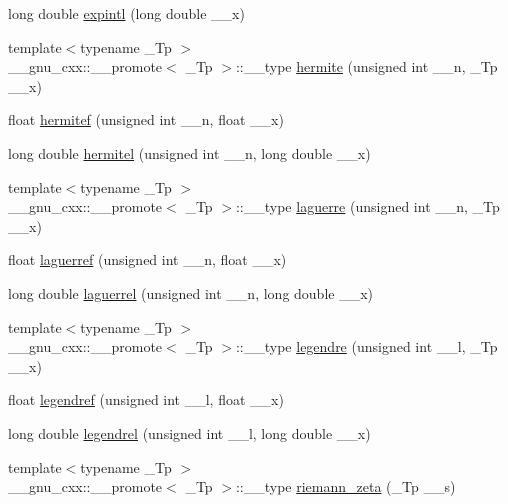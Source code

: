 \begin{DoxyCompactItemize}
\item 
long double \hyperlink{group__tr29124__math__spec__func_ga1329130b32328d0666e290ee5931fa4f}{expintl} (long double \+\_\+\+\_\+x)
\item 
{\footnotesize template$<$typename \+\_\+\+Tp $>$ }\\\+\_\+\+\_\+gnu\+\_\+cxx\+::\+\_\+\+\_\+promote$<$ \+\_\+\+Tp $>$\+::\+\_\+\+\_\+type \hyperlink{group__tr29124__math__spec__func_ga97632b8bf77c323b2369e8d327965bdf}{hermite} (unsigned int \+\_\+\+\_\+n, \+\_\+\+Tp \+\_\+\+\_\+x)
\item 
float \hyperlink{group__tr29124__math__spec__func_ga94dae7444bb349e33057a92932db8abe}{hermitef} (unsigned int \+\_\+\+\_\+n, float \+\_\+\+\_\+x)
\item 
long double \hyperlink{group__tr29124__math__spec__func_ga21f8e312ee3e65286f86bf141b0f32e0}{hermitel} (unsigned int \+\_\+\+\_\+n, long double \+\_\+\+\_\+x)
\item 
{\footnotesize template$<$typename \+\_\+\+Tp $>$ }\\\+\_\+\+\_\+gnu\+\_\+cxx\+::\+\_\+\+\_\+promote$<$ \+\_\+\+Tp $>$\+::\+\_\+\+\_\+type \hyperlink{group__tr29124__math__spec__func_gacae65579b397fddcd27954380d364a58}{laguerre} (unsigned int \+\_\+\+\_\+n, \+\_\+\+Tp \+\_\+\+\_\+x)
\item 
float \hyperlink{group__tr29124__math__spec__func_gada763419b0e21b38e38daa8b6eb56a8c}{laguerref} (unsigned int \+\_\+\+\_\+n, float \+\_\+\+\_\+x)
\item 
long double \hyperlink{group__tr29124__math__spec__func_gaaf8b141edf9163b37ea4f2ed3e0191fc}{laguerrel} (unsigned int \+\_\+\+\_\+n, long double \+\_\+\+\_\+x)
\item 
{\footnotesize template$<$typename \+\_\+\+Tp $>$ }\\\+\_\+\+\_\+gnu\+\_\+cxx\+::\+\_\+\+\_\+promote$<$ \+\_\+\+Tp $>$\+::\+\_\+\+\_\+type \hyperlink{group__tr29124__math__spec__func_gaf6eac7fcb98e25b8f3f7d1b95fa7add8}{legendre} (unsigned int \+\_\+\+\_\+l, \+\_\+\+Tp \+\_\+\+\_\+x)
\item 
float \hyperlink{group__tr29124__math__spec__func_gaed94e3c664c99f5204da75be75aeac21}{legendref} (unsigned int \+\_\+\+\_\+l, float \+\_\+\+\_\+x)
\item 
long double \hyperlink{group__tr29124__math__spec__func_ga1b39bc22e3cc4860d08eb54099460391}{legendrel} (unsigned int \+\_\+\+\_\+l, long double \+\_\+\+\_\+x)
\item 
{\footnotesize template$<$typename \+\_\+\+Tp $>$ }\\\+\_\+\+\_\+gnu\+\_\+cxx\+::\+\_\+\+\_\+promote$<$ \+\_\+\+Tp $>$\+::\+\_\+\+\_\+type \hyperlink{group__tr29124__math__spec__func_ga67a6bfed9b6ab692e8c798b674431424}{riemann\+\_\+zeta} (\+\_\+\+Tp \+\_\+\+\_\+s)

\end{DoxyCompactItemize}
